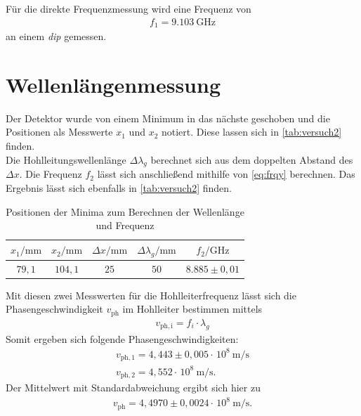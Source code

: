 Für die direkte Frequenzmessung wird eine Frequenz von
\begin{align*}
    f_1 = \qty{9,103}{\giga\hertz}
\end{align*}
an einem \textit{dip} gemessen.

\section{Wellenlängenmessung}

Der Detektor wurde von einem Minimum in das nächste geschoben und die Positionen als Messwerte $x_1$ und $x_2$ notiert. Diese lassen sich in \autoref{tab:versuch2} finden.\\
Die Hohlleitungswellenlänge $\Delta \lambda_g$ berechnet sich aus dem doppelten Abstand des $\Delta x$. Die Frequenz $f_2$ lässt sich anschließend mithilfe von \autoref{eq:frqy} berechnen.
Das Ergebnis lässt sich ebenfalls in \autoref{tab:versuch2} finden.\\

\begin{table}[htbp] 
    \centering 
    \begin{tabular}{c c c c c} 
        \toprule $x_1 / \mathrm{mm}$ & $x_2 / \mathrm{mm}$ & $\Delta x / \mathrm{mm}$ & $\Delta \lambda_g / \mathrm{mm}$ & $f_2 / \mathrm{GHz}$ \\ 
        \midrule 
        $79,1$  &  $104,1$ &  $25$ & $50$ &$ 8.885  \pm 0,01$ \\
        \bottomrule 
    \end{tabular} 
    \caption[Tabelle]{Positionen der Minima zum Berechnen der Wellenlänge und Frequenz} 
    \label{tab:versuch2} 
\end{table}

Mit diesen zwei Messwerten für die Hohlleiterfrequenz lässt sich die Phasengeschwindigkeit $v_{\mathrm{ph}}$ im Hohlleiter bestimmen mittels
\begin{align*}
    v_{\mathrm{ph, i}} = f_i \cdot  \lambda_g
\end{align*}
Somit ergeben sich folgende Phasengeschwindigkeiten:
\begin{align*}
    v_{\mathrm{ph, 1}} = 4,443 \pm 0,005\cdot \, 10^8 \qty{}{\metre\per\second} \\
    v_{\mathrm{ph, 2}} = 4,552 \cdot \, 10^8 \qty{}{\metre\per\second} .
\end{align*}
Der Mittelwert mit Standardabweichung ergibt sich hier zu
\begin{align*}
    v_{\mathrm{ph}} = 4,4970 \pm 0,0024  \cdot \, 10^8 \qty{}{\metre\per\second} .
\end{align*}

